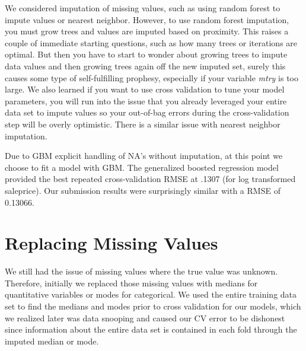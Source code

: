 \documentclass[12pt]{article}
\begin{document}
We considered imputation of missing values, such as using random forest to impute values or nearest neighbor.  However, to use random forest imputation, you must grow trees and values are imputed based on proximity.  This raises a couple of immediate starting questions, such as how many trees or iterations are optimal.  But then you have to start to wonder about growing trees to impute data values and then growing trees again off the new imputed set, surely this causes some type of self-fulfilling prophesy, especially if your variable \emph{mtry} is too large.  We also learned if you want to use cross validation to tune your model parameters, you will run into the issue that you already leveraged your entire data set to impute values so your out-of-bag errors during the cross-validation step will be overly optimistic.  There is a similar issue with nearest neighbor imputation.

Due to GBM explicit handling of NA's without imputation, at this point we choose to fit a model with GBM.  The generalized boosted regression model provided the best repeated cross-validation RMSE at .1307 (for log transformed saleprice). Our submission results were surprisingly similar with a RMSE of 0.13066. %

\section{Replacing Missing Values}

We still had the issue of missing values where the true value was unknown.  Therefore, initially we replaced those missing values with medians for quantitative variables or modes for categorical.  We used the entire training data set to find the medians and modes prior to cross validation for our models, which we realized later was data snooping and  caused our CV error to be dishonest since information about the entire data set is contained in each fold through the imputed median or mode.
\end{document}
